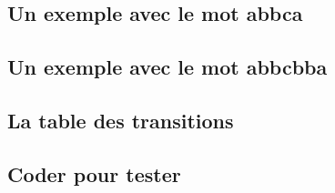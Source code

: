 \subsection{Un exemple avec le mot abbca}

	


\subsection{Un exemple avec le mot abbcbba}

	


\subsection{La table des transitions} \label{table-palindrome-1-tape}

	


\subsection{Coder pour tester}

	
